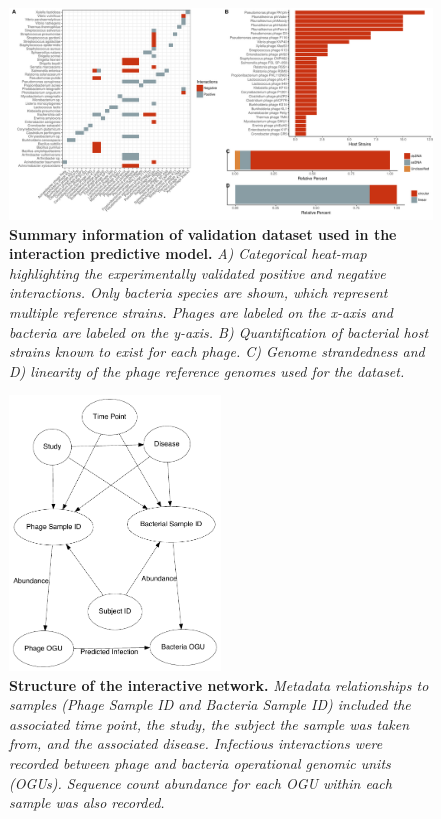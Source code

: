 \documentclass[12pt,]{article}
\begin{document}
\begin{figure}[htbp]
\centering
\includegraphics[width=1.00000\textwidth]{../figures/BenchmarkDataset.pdf}
\caption{\textbf{Summary information of validation dataset used in the
interaction predictive model.} \emph{A) Categorical heat-map
highlighting the experimentally validated positive and negative
interactions. Only bacteria species are shown, which represent multiple
reference strains. Phages are labeled on the x-axis and bacteria are
labeled on the y-axis. B) Quantification of bacterial host strains known
to exist for each phage. C) Genome strandedness and D) linearity of the
phage reference genomes used for the
dataset.}\label{ValidationOverview}}
\end{figure}

\newpage

\begin{figure}[htbp]
\centering
\includegraphics[width=0.50000\textwidth]{../figures/graphdatabasediagram.pdf}
\caption{\textbf{Structure of the interactive network.} \emph{Metadata
relationships to samples (Phage Sample ID and Bacteria Sample ID)
included the associated time point, the study, the subject the sample
was taken from, and the associated disease. Infectious interactions were
recorded between phage and bacteria operational genomic units (OGUs).
Sequence count abundance for each OGU within each sample was also
recorded.}\label{NetworkDiagram}}
\end{figure}
\end{document}
